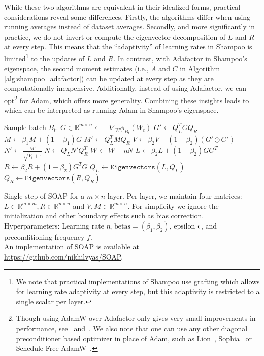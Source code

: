 \documentclass{article} %
\begin{document}
While these two algorithms are equivalent in their idealized forms, practical considerations reveal some differences. Firstly, the algorithms differ when using running averages instead of dataset averages.
Secondly, and more significantly in practice, we do not invert or compute the eigenvector decomposition of $L$ and $R$ at every step. This means that the ``adaptivity'' of learning rates in Shampoo is limited\footnote{We note that practical implementations of Shampoo use grafting which allows for learning rate adaptivity at every step, but this adaptivity is restricted to a single scalar per layer.} to the updates of $L$ and $R$. In contrast, with Adafactor in Shampoo's eigenspace, the second moment estimates (i.e., $A$ and $C$ in Algorithm \ref{alg:shampoo_adafactor}) can be updated at every step as they are computationally inexpensive. Additionally, instead of using Adafactor, we can opt\footnote{Though using AdamW over Adafactor only gives very small improvements in performance, see~ and~. We also note that one can use any other diagonal preconditioner based optimizer in place of Adam, such as Lion~\citep{lion}, Sophia~\citep{liu2024sophia} or Schedule-Free AdamW~\citep{schedulefree}.} for Adam, which offers more generality. Combining these insights leads to~ which can be interpreted as running Adam in Shampoo's eigenspace.

\begin{algorithm}[t]
	
	\begin{algorithmic}[1]
		\STATE Sample batch $B_t$.
		\STATE $G \in \mathbb{R}^{m \times n} \gets -\nabla_W \phi_{B_t}(W_t)$
		\STATE $G' \gets Q_L^T G Q_R$
		\STATE $M \gets \beta_1 M + (1-\beta_1) G$
		\STATE $M' \gets Q_L^T M Q_R$
		\STATE {}
		\STATE $V \gets \beta_2 V + (1-\beta_2) (G' \odot G')$ 
		\STATE $N' \gets \frac{M'}{\sqrt{\hat{V}_t} + \epsilon}$ 
		\STATE {}
		\STATE $N \gets Q_L N' Q_R^T$ 
		\STATE $W \gets W - \eta N$
		\STATE {}
		\STATE $L \gets \beta_2  L + (1-\beta_2) GG^T$
		\STATE $R \gets \beta_2  R + (1-\beta_2) G^TG$
		\STATE $Q_L \gets \texttt{Eigenvectors}(L, Q_L)$
		\STATE $Q_R \gets \texttt{Eigenvectors}(R, Q_R)$
		\ENDIF
	\end{algorithmic}
	\caption{Single step of SOAP for a $m \times n$ layer. Per layer, we  maintain four matrices: $L \in \mathbb{R}^{m \times m}, R \in \mathbb{R}^{n \times n}$ and $V, M \in \mathbb{R}^{m \times n}$. For simplicity we  ignore the initialization and other boundary effects such as bias correction. Hyperparameters: Learning rate $\eta$, $\text{betas} = (\beta_1, \beta_2)$, epsilon ${\epsilon}$, and preconditioning frequency $f$.\\ An implementation of SOAP is available at \url{https://github.com/nikhilvyas/SOAP}.}
	\label{alg:SOAP}
\end{algorithm}
\end{document}
